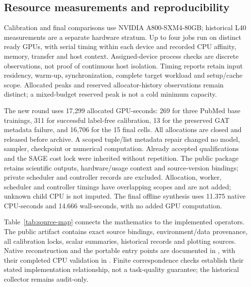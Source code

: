 \subsection{Resource measurements and reproducibility}
Calibration and final comparisons use NVIDIA A800-SXM4-80GB; historical L40 measurements are a separate hardware stratum. Up to four jobs run on distinct ready GPUs, with serial timing within each device and recorded CPU affinity, memory, transfer and host context. Assigned-device process checks are discrete observations, not proof of continuous host isolation. Timing reports retain input residency, warm-up, synchronization, complete target workload and setup/cache scope. Allocated peaks and reserved allocator-history observations remain distinct; a mixed-budget reserved peak is not a cold minimum capacity.

The new round uses 17,299 allocated GPU-seconds: 269 for three PubMed base trainings, 311 for successful label-free calibration, 13 for the preserved GAT metadata failure, and 16,706 for the 15 final cells. All allocations are closed and released before archive. A scoped tuple/list metadata repair changed no model, sampler, checkpoint or numerical computation. Already accepted qualifications and the SAGE cost lock were inherited without repetition. The public package retains scientific outputs, hardware/usage context and source-version bindings; private scheduler and controller records are excluded. Allocation, worker, scheduler and controller timings have overlapping scopes and are not added; unknown child CPU is not imputed. The final offline synthesis uses 11.375 native CPU-seconds and 14.666 wall-seconds, with no added GPU computation.

Table~\ref{tab:source-map} connects the mathematics to the implemented operators. The public artifact contains exact source bindings, environment/data provenance, all calibration locks, scalar summaries, historical records and plotting sources. Native reconstruction and the portable entry points are documented in , with their completed CPU validation in . Finite correspondence checks establish their stated implementation relationship, not a task-quality guarantee; the historical collector remains audit-only.

